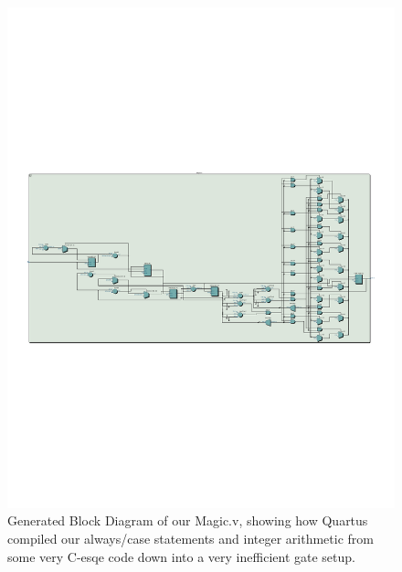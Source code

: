 \documentclass[11pt]{article}
\begin{document}
\begin{figure}[H]
    \centering
        \includegraphics[clip, trim=1cm 9cm 1cm 7cm,  width=\textwidth]{Magic}
        \caption{Generated Block Diagram of our Magic.v, showing how Quartus compiled our always/case statements and integer arithmetic from some very C-esqe code down into a very inefficient gate setup.}
\end{figure}
\end{document}
